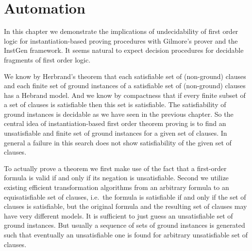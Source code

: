 
\chapter{Automation}



In this chapter we demonstrate the implications of undecidability of first order logic 
for instantiation-based proving procedures with Gilmore's prover and the InstGen framework.
It seems natural to expect decision procedures for decidable fragments of first order logic.

%
We know by Herbrand's theorem 
that each satisfiable set of (non-ground) clauses
and each finite set of ground instances of a satisfiable set of (non-ground) clauses
has a Hebrand model. 
And we know by compactness 
that if every finite subset of a set of clauses is satisfiable then this set is satisfiable.
The satisfiability of ground instances is decidable as we have seen in the previous chapter.
So the central idea of instantiation-based first order theorem proving 
is to find an unsatisfiable and finite set of ground instances for a given set of clauses.
In general a failure in this search does not show satisfiability of the given set of clauses.


To actually prove a theorem 
we first make use of the fact that a first-order formula is valid if and only if its negation is unsatisfiable.
Second we utilize existing efficient transformation algorithms \cite{tseitin70, PLAISTED1986293}
from an arbitrary formula to an equisatisfiable set of clauses, 
i.e.~the formula is satisfiable if and only if the set of clauses is satisfiable, 
but the original formula and the resulting set of clauses may have very different models.
It is sufficient to just guess an unsatisfiable set of ground instances. 
But usually a sequence of sets of ground instances is generated 
such that eventually an unsatisfiable one is found for arbitrary unsatisfiable set of clauses.



%
%
%
%
%




